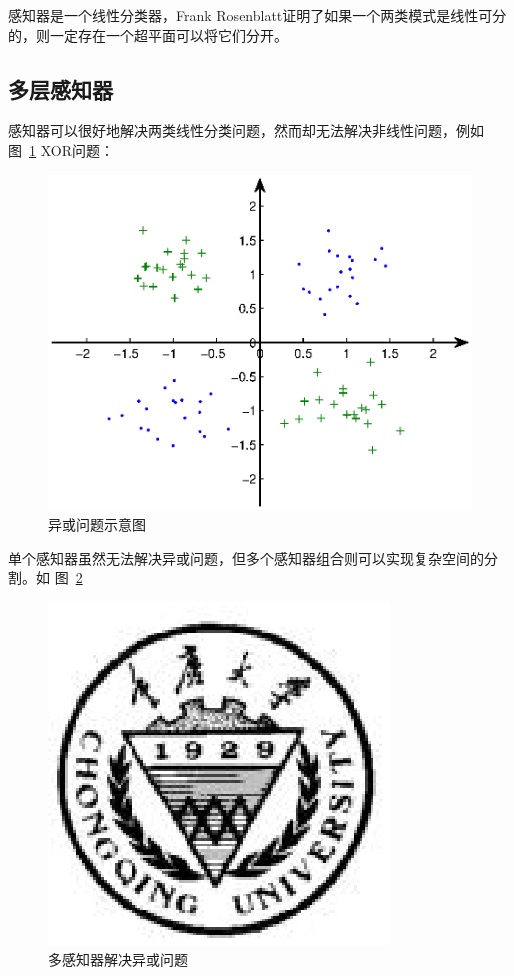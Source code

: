 \documentclass[bachelor,zhspacing]{cqu}  %
\begin{document}
感知器是一个线性分类器，Frank
Rosenblatt证明了如果一个两类模式是线性可分的，则一定存在一个超平面可以将它们分开。

\subsection{多层感知器}\label{ux591aux5c42ux611fux77e5ux5668}

感知器可以很好地解决两类线性分类问题，然而却无法解决非线性问题，例如
图~\ref{fig:xor} XOR问题：

\begin{figure}[htbp]
\centering
\includegraphics{./pic/xor.eps}
\caption{异或问题示意图}\label{fig:xor}
\end{figure}

单个感知器虽然无法解决异或问题，但多个感知器组合则可以实现复杂空间的分割。如
图~\ref{fig:mlp-xor}

\begin{figure}[htbp]
\centering
\includegraphics{./pic/cqu.eps}
\caption{多感知器解决异或问题}\label{fig:mlp-xor}
\end{figure}
\end{document}
